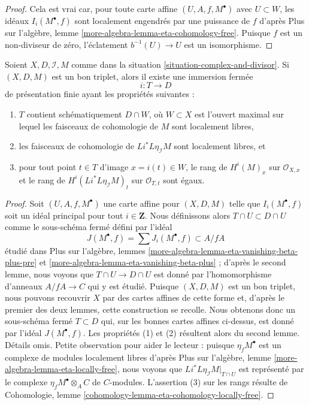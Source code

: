 \begin{proof}
Cela est vrai car, pour toute carte affine $(U, A, f, M^\bullet)$
avec $U \subset W$, les idéaux $I_i(M^\bullet, f)$ sont localement
engendrés par une puissance de $f$ d'après
Plus sur l'algèbre, lemme \ref{more-algebra-lemma-eta-cohomology-free}.
Puisque $f$ est un non-diviseur de zéro,
l'éclatement $b^{-1}(U) \to U$ est un isomorphisme.
\end{proof}

\begin{lemma}
\label{lemma-complex-and-divisor-blowup-good-T}
Soient $X, D, \mathcal{I}, M$ comme dans la
situation \ref{situation-complex-and-divisor}.
Si $(X, D, M)$ est un bon triplet, alors il existe une
immersion fermée
$$
i : T \longrightarrow D
$$
de présentation finie ayant les propriétés suivantes :
\begin{enumerate}
\item $T$ contient schématiquement $D \cap W$,
où $W \subset X$ est l'ouvert maximal sur lequel les
faisceaux de cohomologie de $M$ sont localement libres,
\item les faisceaux de cohomologie de $Li^*L\eta_\mathcal{I}M$
sont localement libres, et
\item pour tout point $t \in T$ d'image $x = i(t) \in W$, le rang
de $H^i(M)_x$ sur $\mathcal{O}_{X, x}$ et le rang
de $H^i(Li^*L\eta_\mathcal{I}M)_t$ sur $\mathcal{O}_{T, t}$ sont égaux.
\end{enumerate}
\end{lemma}

\begin{proof}
Soit $(U, A, f, M^\bullet)$ une carte affine pour $(X, D, M)$\newline
telle que $I_i(M^\bullet, f)$ soit un idéal principal pour tout $i \in \mathbf{Z}$.
Nous définissons alors $T \cap U \subset D \cap U$ comme le sous-schéma fermé
défini par l'idéal
$$
J(M^\bullet, f) = \sum J_i(M^\bullet, f) \subset A/fA
$$
étudié dans Plus sur l'algèbre, lemmes
\ref{more-algebra-lemma-eta-vanishing-beta-plus-pre} et
\ref{more-algebra-lemma-eta-vanishing-beta-plus} ;
d'après le second lemme, nous voyons que $T \cap U \to D \cap U$
est donné par l'homomorphisme d'anneaux $A/fA \to C$ qui y est étudié.
Puisque $(X, D, M)$ est un bon triplet, nous pouvons recouvrir $X$ par
des cartes affines de cette forme et, d'après le premier des deux
lemmes, cette construction se recolle. Nous obtenons donc un sous-schéma
fermé $T \subset D$ qui, sur les bonnes cartes affines ci-dessus,
est donné par l'idéal $J(M^\bullet, f)$. Les propriétés
(1) et (2) résultent alors du second lemme. Détails omis.
Petite observation pour aider le lecteur :
puisque $\eta_fM^\bullet$ est un complexe de modules localement libres
d'après Plus sur l'algèbre, lemme \ref{more-algebra-lemma-eta-locally-free},
nous voyons que $Li^*L\eta_\mathcal{I}M|_{T \cap U}$
est représenté par le complexe $\eta_fM^\bullet \otimes_A C$
de $C$-modules. L'assertion (3) sur les rangs résulte de
Cohomologie, lemme \ref{cohomology-lemma-eta-cohomology-locally-free}.
\end{proof}

